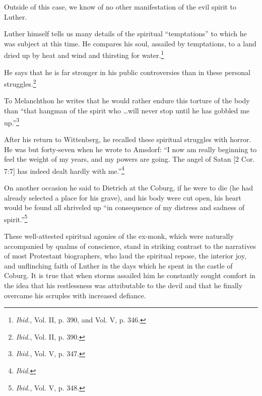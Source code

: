 Outside of this
case, we know of no other manifestation of the evil spirit to Luther.

Luther himself tells us many details of the spiritual “temptations”
to which he was subject at this time. He compares his soul, assailed
by temptations, to a land dried up by heat and wind and thirsting for
water.\footnote{\textit{Ibid.}, Vol. II, p. 390, and Vol. V, p. 346.}

He says that he is far stronger in his public controversies than
in these personal struggles.\footnote{\textit{Ibid.}, Vol. II, p. 390.}

To Melanchthon he writes that he would
rather endure this torture of the body than “that hangman of the
spirit who \dots will never stop until he has gobbled me up.”\footnote{\textit{Ibid.}, Vol. V, p. 347.}

After
his return to Wittenberg, he recalled these spiritual struggles with
horror. He was but forty-seven when he wrote to Amsdorf: “I now
am really beginning to feel the weight of my years, and my powers
are going. The angel of Satan [2 Cor. 7:7] has indeed dealt hardly
with me.”\footnote{\textit{Ibid.}}

On another occasion he said to Dietrich at the Coburg,
if he were to die (he had already selected a place for his grave),
and his body were cut open, his heart would be found all shriveled
up “in consequence of my distress and sadness of spirit.”\footnote{\textit{Ibid.}, Vol. V, p. 348.}


These well-attested spiritual agonies of the ex-monk, which were
naturally accompanied by qualms of conscience, stand in striking
contrast to the narratives of most Protestant biographers, who laud
the spiritual repose, the interior joy, and unflinching faith of Luther
in the days which he spent in the castle of Coburg. It is true that when
storms assailed him he constantly sought comfort in the idea that his
restlessness was attributable to the devil and that he finally overcame
his scruples with increased defiance.

